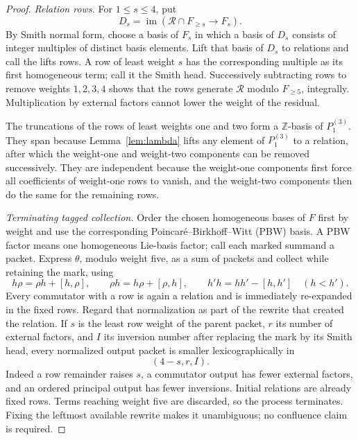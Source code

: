 \documentclass[11pt]{amsart}
\newcommand{\Z}{\mathbb Z}
\newcommand{\Rel}{\mathcal R}
\begin{document}
\begin{proof}
\emph{Relation rows.}
For $1\leq s\leq4$, put
\[
 D_s=\operatorname{im}(\Rel\cap F_{\geq s}\longrightarrow F_s).
\]
By Smith normal form, choose a basis of $F_s$ in which a basis of
$D_s$ consists of integer multiples of distinct basis elements.  Lift
that basis of $D_s$ to relations and call the lifts rows.  A row of
least weight $s$ has the corresponding multiple as its first
homogeneous term; call it the Smith head.  Successively
subtracting rows to remove weights $1,2,3,4$ shows that the rows
generate $\Rel$ modulo $F_{\geq5}$, integrally.  Multiplication by
external factors cannot lower the weight of the residual.

The truncations of the rows of least weights one and two form a
$\Z$-basis of $P^{(3)}_1$.  They span because Lemma~\ref{lem:lambda}
lifts any element of $P^{(3)}_1$ to a relation, after which the
weight-one and weight-two components can be removed successively.
They are independent because the weight-one components first force
all coefficients of weight-one rows to vanish, and the weight-two
components then do the same for the remaining rows.

\emph{Terminating tagged collection.}
Order the chosen homogeneous bases of $F$ first by weight and use the
corresponding Poincar\'e--Birkhoff--Witt (PBW) basis.  A PBW factor
means one homogeneous Lie-basis factor; call each marked summand a
packet.  Express $\theta$, modulo
weight five, as a sum of packets and collect while retaining the mark,
using
\begin{equation}\label{eq:collection-identities}
 h\rho=\rho h+[h,\rho],
 \qquad \rho h=h\rho+[\rho,h],
 \qquad h'h=hh'-[h,h']\quad(h<h').
\end{equation}
Every commutator with a row is again a relation and is immediately
re-expanded in the fixed rows.  Regard that normalization as part of
the rewrite that created the relation.  If $s$ is the least row
weight of the parent packet, $r$ its number of external factors, and
$I$ its inversion number after replacing the mark by its Smith head,
every normalized output packet is smaller lexicographically in
\[
                              (4-s,r,I).
\]
Indeed a row remainder raises $s$, a commutator output has fewer
external factors, and an ordered principal output has fewer
inversions.  Initial relations are already fixed rows.  Terms
reaching weight five are discarded, so the process terminates.
Fixing the leftmost available rewrite makes it unambiguous; no
confluence claim is required.


\end{proof}
\end{document}

